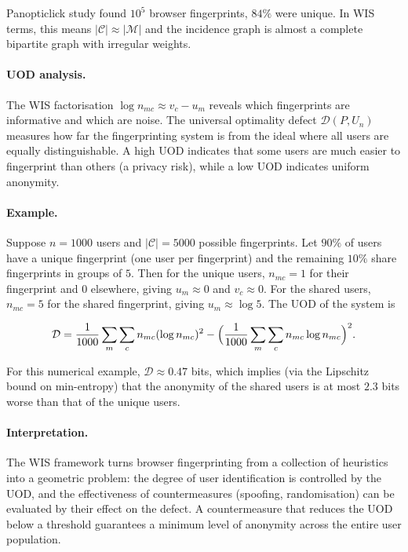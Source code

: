 Panopticlick study \cite{eckersley2010unique} found
$10^5$ browser fingerprints, $84\%$ were unique.  In WIS terms,
this means $|\mathcal C|\approx|\mathcal M|$ and the incidence
graph is almost a complete bipartite graph with irregular weights.

\paragraph{UOD analysis.}
The WIS factorisation $\log n_{mc}\approx v_c-u_m$ reveals which
fingerprints are informative and which are noise.  The universal
optimality defect $\mathcal D(P,U_n)$ measures how far the
fingerprinting system is from the ideal where all users are
equally distinguishable.  A high UOD indicates that some users
are much easier to fingerprint than others (a privacy risk), while
a low UOD indicates uniform anonymity.

\paragraph{Example.}
Suppose $n=1000$ users and $|\mathcal C|=5000$ possible fingerprints.
Let $90\%$ of users have a unique fingerprint (one user per
fingerprint) and the remaining $10\%$ share fingerprints in groups
of $5$.  Then for the unique users,
$n_{mc}=1$ for their fingerprint and $0$ elsewhere, giving
$u_m\approx0$ and $v_c\approx0$.  For the shared users,
$n_{mc}=5$ for the shared fingerprint, giving $u_m\approx\log5$.
The UOD of the system is

\[
\mathcal D = \frac{1}{1000}\sum_{m}\sum_{c} n_{mc}(\log n_{mc})^2
- \Bigl(\frac{1}{1000}\sum_{m}\sum_{c} n_{mc}\log n_{mc}\Bigr)^2.
\]

For this numerical example, $\mathcal D\approx0.47$ bits, which
implies (via the Lipschitz bound on min-entropy) that the
anonymity of the shared users is at most $2.3$ bits worse than
that of the unique users.

\paragraph{Interpretation.}
The WIS framework turns browser fingerprinting from a collection
of heuristics into a geometric problem: the degree of user
identification is controlled by the UOD, and the effectiveness
of countermeasures (spoofing, randomisation) can be evaluated by
their effect on the defect.  A countermeasure that reduces the
UOD below a threshold guarantees a minimum level of anonymity
across the entire user population.

